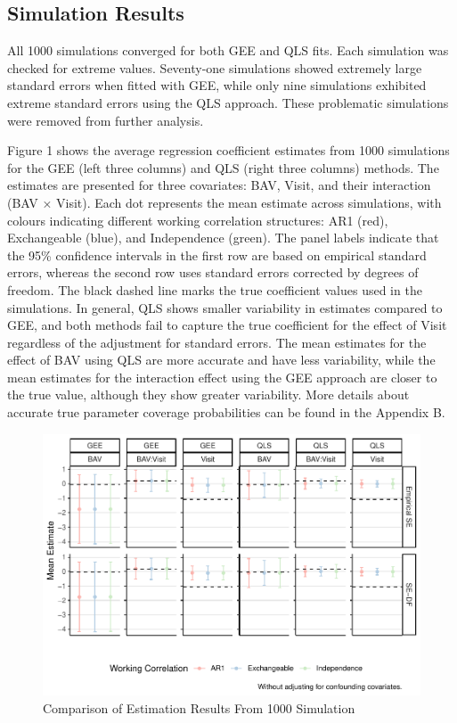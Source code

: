 \documentclass[
]{aft}
\begin{document}
\subsection{Simulation Results}\label{simulation-results}

All 1000 simulations converged for both GEE and QLS fits. Each
simulation was checked for extreme values. Seventy-one simulations
showed extremely large standard errors when fitted with GEE, while only
nine simulations exhibited extreme standard errors using the QLS
approach. These problematic simulations were removed from further
analysis.

Figure 1 shows the average regression coefficient estimates from 1000
simulations for the GEE (left three columns) and QLS (right three
columns) methods. The estimates are presented for three covariates: BAV,
Visit, and their interaction (BAV × Visit). Each dot represents the mean
estimate across simulations, with colours indicating different working
correlation structures: AR1 (red), Exchangeable (blue), and Independence
(green). The panel labels indicate that the 95\% confidence intervals in
the first row are based on empirical standard errors, whereas the second
row uses standard errors corrected by degrees of freedom. The black
dashed line marks the true coefficient values used in the simulations.
In general, QLS shows smaller variability in estimates compared to GEE,
and both methods fail to capture the true coefficient for the effect of
Visit regardless of the adjustment for standard errors. The mean
estimates for the effect of BAV using QLS are more accurate and have
less variability, while the mean estimates for the interaction effect
using the GEE approach are closer to the true value, although they show
greater variability. More details about accurate true parameter coverage
probabilities can be found in the Appendix B.

\begin{figure}[H]

{\centering \includegraphics{FinalReport_files/figure-pdf/unnamed-chunk-3-1.pdf}

}

\caption{Comparison of Estimation Results From 1000 Simulation}

\end{figure}%
\end{document}
